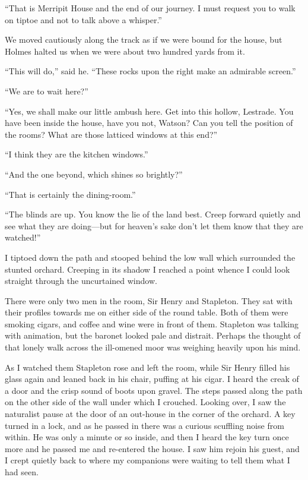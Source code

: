 \documentclass[paper=a5,BCOR=7mm,twoside,DIV=calc,12pt,usegeometry,openany,chapterprefix,endperiod,headings=big]{scrbook} %
\begin{document}
\enquote{That is Merripit House and the end of our journey. I must request you to walk on tiptoe and not to talk above a whisper.}

We moved cautiously along the track as if we were bound for the house, but Holmes halted us when we were about two hundred yards from it.

\enquote{This will do,} said he. \enquote{These rocks upon the right make an admirable screen.}

\enquote{We are to wait here?}

\enquote{Yes, we shall make our little ambush here. Get into this hollow, Lestrade. You have been inside the house, have you not, Watson? Can you tell the position of the rooms? What are those latticed windows at this end?}

\enquote{I think they are the kitchen windows.}

\enquote{And the one beyond, which shines so brightly?}

\enquote{That is certainly the dining-room.}

\enquote{The blinds are up. You know the lie of the land best. Creep forward quietly and see what they are doing---but for heaven's sake don't let them know that they are watched!}

I tiptoed down the path and stooped behind the low wall which surrounded the stunted orchard. Creeping in its shadow I reached a point whence I could look straight through the uncurtained window.

There were only two men in the room, Sir Henry and Stapleton. They sat with their profiles towards me on either side of the round table. Both of them were smoking cigars, and coffee and wine were in front of them. Stapleton was talking with animation, but the baronet looked pale and distrait. Perhaps the thought of that lonely walk across the ill-omened moor was weighing heavily upon his mind.


As I watched them Stapleton rose and left the room, while Sir Henry filled his glass again and leaned back in his chair, puffing at his cigar. I heard the creak of a door and the crisp sound of boots upon gravel. The steps passed along the path on the other side of the wall under which I crouched. Looking over, I saw the naturalist pause at the door of an out-house in the corner of the orchard. A key turned in a lock, and as he passed in there was a curious scuffling noise from within. He was only a minute or so inside, and then I heard the key turn once more and he passed me and re-entered the house. I saw him rejoin his guest, and I crept quietly back to where my companions were waiting to tell them what I had seen.
\end{document}
